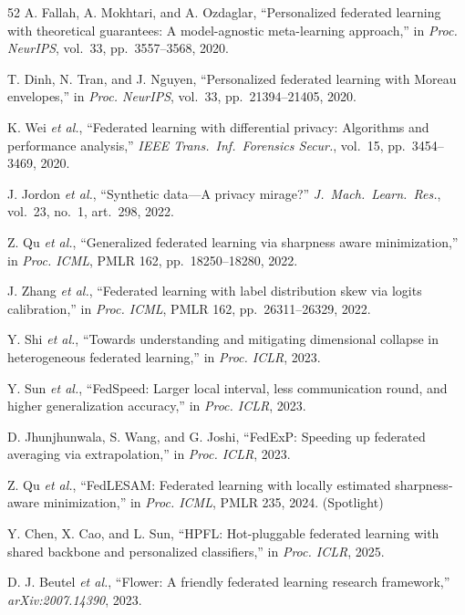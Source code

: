 \documentclass[conference]{IEEEtran}
\begin{document}
\begin{thebibliography}{52}
A. Fallah, A. Mokhtari, and A. Ozdaglar, ``Personalized federated learning with theoretical guarantees: A model-agnostic meta-learning approach,'' in \textit{Proc. NeurIPS}, vol.~33, pp.~3557--3568, 2020.

T. Dinh, N. Tran, and J. Nguyen, ``Personalized federated learning with Moreau envelopes,'' in \textit{Proc. NeurIPS}, vol.~33, pp.~21394--21405, 2020.

K. Wei \textit{et al.}, ``Federated learning with differential privacy: Algorithms and performance analysis,'' \textit{IEEE Trans.~Inf.~Forensics Secur.}, vol.~15, pp.~3454--3469, 2020.

J. Jordon \textit{et al.}, ``Synthetic data---A privacy mirage?'' \textit{J.~Mach.~Learn.~Res.}, vol.~23, no.~1, art.~298, 2022.

Z. Qu \textit{et al.}, ``Generalized federated learning via sharpness aware minimization,'' in \textit{Proc. ICML}, PMLR 162, pp.~18250--18280, 2022.

J. Zhang \textit{et al.}, ``Federated learning with label distribution skew via logits calibration,'' in \textit{Proc. ICML}, PMLR 162, pp.~26311--26329, 2022.

Y. Shi \textit{et al.}, ``Towards understanding and mitigating dimensional collapse in heterogeneous federated learning,'' in \textit{Proc. ICLR}, 2023.

Y. Sun \textit{et al.}, ``FedSpeed: Larger local interval, less communication round, and higher generalization accuracy,'' in \textit{Proc. ICLR}, 2023.

D. Jhunjhunwala, S. Wang, and G. Joshi, ``FedExP: Speeding up federated averaging via extrapolation,'' in \textit{Proc. ICLR}, 2023.

Z. Qu \textit{et al.}, ``FedLESAM: Federated learning with locally estimated sharpness-aware minimization,'' in \textit{Proc. ICML}, PMLR 235, 2024. (Spotlight)

Y. Chen, X. Cao, and L. Sun, ``HPFL: Hot-pluggable federated learning with shared backbone and personalized classifiers,'' in \textit{Proc. ICLR}, 2025.

D. J. Beutel \textit{et al.}, ``Flower: A friendly federated learning research framework,'' \textit{arXiv:2007.14390}, 2023.


\end{thebibliography}
\end{document}
